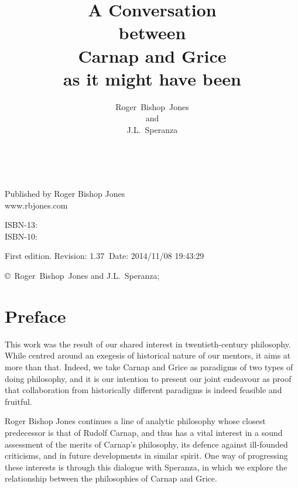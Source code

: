 \documentclass[10pt,titlepage]{book}
\title{A Conversation\\{\small between}\\Carnap and Grice\\{\small as it might have been}}
\author{Roger~Bishop~Jones\\\small{and}\\J.L.~Speranza}
\date{\ }
\begin{document}
\frontmatter
                               
\begin{titlepage}
\maketitle


\hspace{2in}

\vfill

\begin{centering}

Published by Roger Bishop Jones\\
www.rbjones.com\\
\vspace{0.2in}

ISBN-13: \\
ISBN-10: 

\vspace{0.2in}

{\footnotesize

First edition. $ $Revision: 1.37 $~$Date: 2014/11/08 19:43:29 $ $

\vspace{0.2in}

\copyright\ Roger~Bishop~Jones and J.L.~Speranza;

}%

\end{centering}


\thispagestyle{empty}
\end{titlepage}

\setcounter{tocdepth}{2}
{\parskip-0pt\tableofcontents}
\listoffigures

\mainmatter


\section*{Preface}
This work was the result of our shared interest in twentieth-century  
philosophy. While centred around an exegesis of historical nature of our  
mentors, it aims at more than that. Indeed, we take Carnap and Grice as  paradigms 
of two types of doing philosophy, and it is our intention to present  our 
joint endeavour as proof that collaboration from historically different  
paradigms is indeed feasible and fruitful.
 
Roger Bishop Jones continues a line of analytic philosophy whose closest predecessor
is that of Rudolf Carnap, and thus has a vital interest in a sound assessment of the
merits of Carnap's philosophy, its defence against ill-founded criticisms, and in
future developments in similar spirit.
One way of progressing these interests is through this dialogue with Speranza,
in which we explore the relationship between the philosophies of Carnap and Grice.
\end{document}
